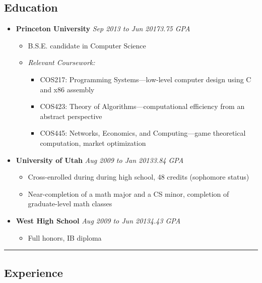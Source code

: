 \documentclass[11pt]{article}
\begin{document}
\subsection*{\textbf{Education}}
\begin{itemize}[nolistsep,topsep=0pt, label=]
\itemsep0.33em

\item \textbf{Princeton University} \emph{Sep 2013 to Jun 2017}\hfill \emph{3.75 GPA}
\begin{itemize}[nolistsep,topsep=0pt, label=]
\item B.S.E. candidate in Computer Science
\item \emph{Relevant Coursework:}
\begin{itemize}[nolistsep,topsep=0pt, label=]
\item {COS217:} Programming Systems---low-level computer design using C and x86 assembly
\item {COS423:} Theory of Algorithms---computational efficiency from an abstract perspective
\item {COS445:} Networks, Economics, and Computing---game theoretical computation, market optimization
\end{itemize}
\end{itemize}

\item \textbf{University of Utah} \emph{Aug 2009 to Jan 2013}\hfill \emph{3.84 GPA}
\begin{itemize}[nolistsep,topsep=0pt, label=]
\item Cross-enrolled during during high school, 48 credits (sophomore status)
\item Near-completion of a math major and a CS minor, completion of graduate-level math classes
\end{itemize}

\item \textbf{West High School} \emph{Aug 2009 to Jun 2013}\hfill \emph{4.43 GPA}
\begin{itemize}[nolistsep,topsep=0pt, label=]
\item Full honors, IB diploma
\end{itemize}
\end{itemize}
\vspace{0.4em}
\hrule
\vspace{-1em}
\subsection*{\textbf{Experience}}
\end{document}
